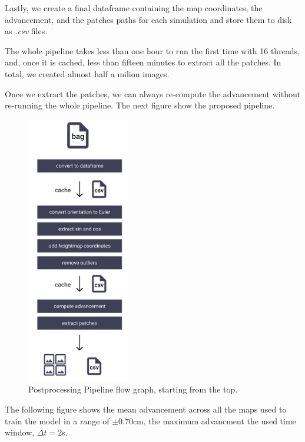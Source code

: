 \documentclass[../document.tex]{subfiles}
\begin{document}
Lastly, we create a final dataframe containing the map coordinates, the advancement, and the patches paths for each simulation and store them to disk as \emph{.csv} files. 

The whole pipeline takes less than one hour to run the first time with 16 threads, and, once it is cached, less than fifteen minutes to extract all the patches. In total, we created almost half a milion images.

Once we extract the patches, we can always re-compute the advancement without re-running the whole pipeline. The next figure show the proposed pipeline.
\begin{figure}[H] 
\centering
\includegraphics[width=0.4\textwidth]{../img/postprocessing-pipeline.png}
\caption{Postprocessing Pipeline flow graph, starting from the top.}
\label{fig: postprocessing-pipeline}
\end{figure}
The following figure shows the mean advancement across all the maps used to train the model in a range of $\pm 0.70$cm, the maximum advancment the used time window, $\Delta t = 2$s.
\end{document}
